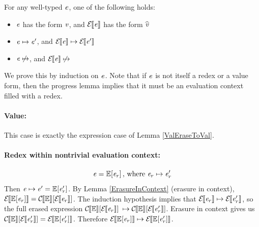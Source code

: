 \begin{lemma}[Lockstep]
  \label{Lockstep}
  For any well-typed $\expr$,
  one of the following holds:
  \begin{itemize}
  \item{$\expr$ has the form $\val$, and $\EraseE{\expr}$ has the form $\evalue$}
  \item{$\expr \mapsto \expr'$, and $\EraseE{\expr} \mapsto \EraseE{\expr'}$}
  \item{$\expr \not \mapsto$, and $\EraseE{\expr} \not \mapsto$}
  \end{itemize}
\end{lemma}
\begin{sproof}
  We prove this by induction on $\expr$.
  Note that if $\expr$ is not itself a redex or a value form,
  then the progress lemma implies that it must be
  an evaluation context filled with a redex.
  \paragraph{Value:}
  This case is exactly the expression case of Lemma \ref{ValEraseToVal}.

  \paragraph{Redex within nontrivial evaluation context:}
  \[\expr = \fillc{\ctxt}{\expr_r}\text{, where }\expr_r \mapsto \expr_r'\]
  Then $\expr \mapsto \expr' = \fillc{\ctxt}{\expr_r'}$.
  By Lemma \ref{ErasureInContext} (erasure in context),
  $\EraseE{\fillc{\ctxt}{\expr_r}} = \fillc{\EraseC{\ctxt}}{\EraseE{\expr_r}}$.
  The induction hypothesis implies that $\EraseE{\expr_r} \mapsto \EraseE{\expr_r'}$,
  so the full erased expression $\fillc{\EraseC{\ctxt}}{\EraseE{\expr_r}}$
  $ \mapsto \fillc{\EraseC{\ctxt}}{\EraseE{\expr_r'}}$.
  Erasure in context gives us
  $\fillc{\EraseC{\ctxt}}{\EraseE{\expr_r'}} = \EraseE{\fillc{\ctxt}{\expr_r'}}$.
  Therefore $\EraseE{\fillc{\ctxt}{\expr_r}} \mapsto \EraseE{\fillc{\ctxt}{\expr_r'}}$.


\end{sproof}
